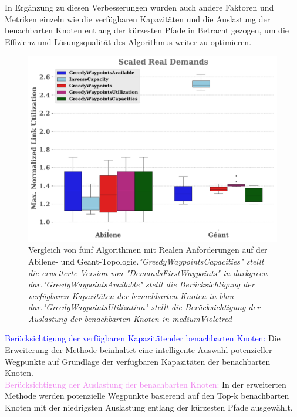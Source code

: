 \documentclass[sigconf, nonacm, review]{acmart}
\begin{document}
In Ergänzung zu diesen Verbesserungen wurden auch andere Faktoren und Metriken einzeln wie die verfügbaren Kapazitäten und die Auslastung der benachbarten Knoten entlang der kürzesten Pfade in Betracht gezogen, um die Effizienz und Lösungsqualität des Algorithmus weiter zu optimieren.\\
\begin{figure}
\centering
\includegraphics[width=\linewidth]{figures/real_demands.pdf}
\caption{Vergleich von fünf Algorithmen mit Realen Anforderungen auf der Abilene- und Geant-Topologie.\emph{"GreedyWaypointsCapacities" stellt die erweiterte Version von "DemandsFirstWaypoints" in darkgreen dar."GreedyWaypointsAvailable" stellt die Berücksichtigung der verfügbaren Kapazitäten der benachbarten
Knoten in blau dar."GreedyWaypointsUtilization" stellt die Berücksichtigung der Auslastung der benachbarten Knoten in mediumVioletred }}
\label{fig}
\end{figure}
\textcolor{blue}{Berücksichtigung der verfügbaren Kapazitätender benachbarten Knoten:} Die Erweiterung der Methode beinhaltet eine intelligente Auswahl potenzieller Wegpunkte auf Grundlage der verfügbaren Kapazitäten der benachbarten Knoten.\\
\textcolor{violet} {Berücksichtigung der Auslastung der benachbarten Knoten:} In
der erweiterten Methode werden potenzielle Wegpunkte basierend
auf den Top-k benachbarten Knoten mit der niedrigsten Auslastung
entlang der kürzesten Pfade ausgewählt.\\
\end{document}
